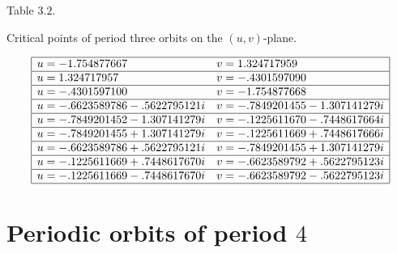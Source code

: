 \documentclass[12pt,a4paper]{amsart}
\numberwithin{equation}{section}
\numberwithin{lause}{section}
\begin{document}
\begin{table}[h]
\begin{center}
Table $3.2$.
\end{center}
\begin{center}
  Critical points of period three orbits on the $(u,v)$-plane.
\end{center}
\begin{displaymath}
\begin{array}{|ll|}
    \hline
  u = -1.754877667 & v = 1.324717959 \\\hline u = 1.324717957 & v = -.4301597090 \\\hline u = -.4301597100 & v = -1.754877668 \\\hline u = -.6623589786-.5622795121i & v = -.7849201455-1.307141279i \\\hline u = -.7849201452-1.307141279i & v = -.1225611670-.7448617664i \\\hline u = -.7849201455+1.307141279i & v = -.1225611669+.7448617666i \\\hline u = -.6623589786+.5622795121i & v = -.7849201455+1.307141279i \\\hline u = -.1225611669+.7448617670i & v = -.6623589792+.5622795123i \\\hline  u = -.1225611669-.7448617670i & v = -.6623589792-.5622795123i \\\hline
\end{array}
\end{displaymath}
\end{table}



\section{Periodic orbits of period $4$}
\end{document}
